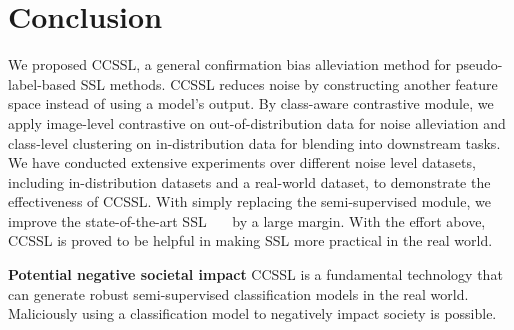 \documentclass[10pt,twocolumn,letterpaper]{article}
\begin{document}
\section{Conclusion}
We proposed CCSSL, a general confirmation bias alleviation method for pseudo-label-based SSL methods. CCSSL reduces noise by constructing another feature space instead of using a model's output. By class-aware contrastive module, we apply image-level contrastive on out-of-distribution data for noise alleviation and class-level clustering on in-distribution data for blending into downstream tasks.  We have conducted extensive experiments over different noise level datasets, including in-distribution datasets and a real-world dataset,  to demonstrate the effectiveness of CCSSL. With simply replacing the semi-supervised module, we improve the state-of-the-art SSL~\cite{sohn2020fixmatch}~\cite{berthelot2019mixmatch}~\cite{li2021comatch} by a large margin.
With the effort above, CCSSL is proved to be helpful in making SSL more practical in the real world. 


\textbf{Potential negative societal impact} CCSSL is a fundamental technology that can generate robust semi-supervised classification models in the real world. Maliciously using a classification model to negatively impact society is possible. 

{\small


}
\end{document}
